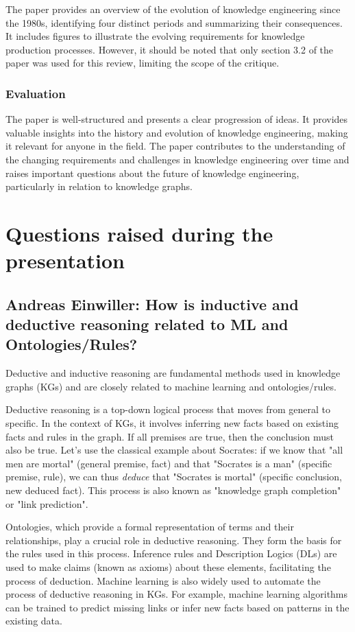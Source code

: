 \documentclass[11pt]{article} %
\begin{document}
The paper provides an overview of the evolution of knowledge engineering since the 1980s, identifying four distinct periods and summarizing their consequences. It includes figures to illustrate the evolving requirements for knowledge production processes. However, it should be noted that only section 3.2 of the paper was used for this review, limiting the scope of the critique.

\subsubsection*{Evaluation}

The paper is well-structured and presents a clear progression of ideas. It provides valuable insights into the history and evolution of knowledge engineering, making it relevant for anyone in the field. The paper contributes to the understanding of the changing requirements and challenges in knowledge engineering over time and raises important questions about the future of knowledge engineering, particularly in relation to knowledge graphs.

\section{Questions raised during the presentation}

\subsection{Andreas Einwiller: How is inductive and deductive reasoning related to ML and Ontologies/Rules?}

Deductive and inductive reasoning are fundamental methods used in knowledge graphs (KGs) and are closely related to machine learning and ontologies/rules.

Deductive reasoning is a top-down logical process that moves from general to specific. In the context of KGs, it involves inferring new facts based on existing facts and rules in the graph. If all premises are true, then the conclusion must also be true. Let's use the classical example about Socrates: if we know that "all men are mortal" (general premise, fact) and that "Socrates is a man" (specific premise, rule), we can thus \textit{deduce} that "Socrates is mortal" (specific conclusion, new deduced fact). This process is also known as "knowledge graph completion" or "link prediction". 

Ontologies, which provide a formal representation of terms and their relationships, play a crucial role in deductive reasoning. They form the basis for the rules used in this process. Inference rules and Description Logics (DLs) are used to make claims (known as axioms) about these elements, facilitating the process of deduction. Machine learning is also widely used to automate the process of deductive reasoning in KGs. For example, machine learning algorithms can be trained to predict missing links or infer new facts based on patterns in the existing data.
\end{document}
